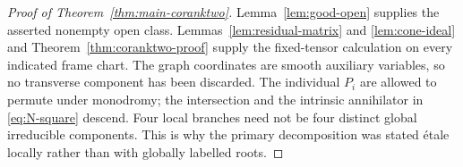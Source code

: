\begin{proof}[Proof of Theorem~\ref{thm:main-coranktwo}]
Lemma~\ref{lem:good-open} supplies the asserted nonempty open class.
Lemmas~\ref{lem:residual-matrix} and \ref{lem:cone-ideal} and
Theorem~\ref{thm:coranktwo-proof} supply the fixed-tensor calculation
on every indicated frame chart. The graph coordinates are smooth
auxiliary variables, so no transverse component has been discarded.
The individual $P_i$ are allowed to permute under monodromy; the
intersection and the intrinsic annihilator in \eqref{eq:N-square}
descend. Four local branches need not be four distinct global
irreducible components. This is why the primary decomposition was
stated \'etale locally rather than with globally labelled roots.
\end{proof}
